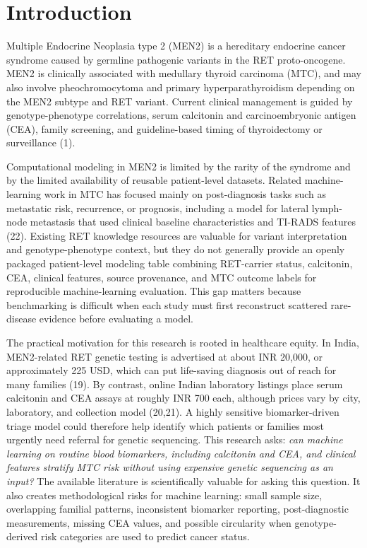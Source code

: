 \documentclass[12pt]{article}
\begin{document}
\section{Introduction}
Multiple Endocrine Neoplasia type 2 (MEN2) is a hereditary endocrine cancer syndrome caused by germline pathogenic variants in the RET proto-oncogene. MEN2 is clinically associated with medullary thyroid carcinoma (MTC), and may also involve pheochromocytoma and primary hyperparathyroidism depending on the MEN2 subtype and RET variant. Current clinical management is guided by genotype-phenotype correlations, serum calcitonin and carcinoembryonic antigen (CEA), family screening, and guideline-based timing of thyroidectomy or surveillance (1).

Computational modeling in MEN2 is limited by the rarity of the syndrome and by the limited availability of reusable patient-level datasets. Related machine-learning work in MTC has focused mainly on post-diagnosis tasks such as metastatic risk, recurrence, or prognosis, including a model for lateral lymph-node metastasis that used clinical baseline characteristics and TI-RADS features (22). Existing RET knowledge resources are valuable for variant interpretation and genotype-phenotype context, but they do not generally provide an openly packaged patient-level modeling table combining RET-carrier status, calcitonin, CEA, clinical features, source provenance, and MTC outcome labels for reproducible machine-learning evaluation. This gap matters because benchmarking is difficult when each study must first reconstruct scattered rare-disease evidence before evaluating a model.

The practical motivation for this research is rooted in healthcare equity. In India, MEN2-related RET genetic testing is advertised at about INR 20,000, or approximately 225 USD, which can put life-saving diagnosis out of reach for many families (19). By contrast, online Indian laboratory listings place serum calcitonin and CEA assays at roughly INR 700 each, although prices vary by city, laboratory, and collection model (20,21). A highly sensitive biomarker-driven triage model could therefore help identify which patients or families most urgently need referral for genetic sequencing. This research asks: \emph{can machine learning on routine blood biomarkers, including calcitonin and CEA, and clinical features stratify MTC risk without using expensive genetic sequencing as an input?} The available literature is scientifically valuable for asking this question. It also creates methodological risks for machine learning: small sample size, overlapping familial patterns, inconsistent biomarker reporting, post-diagnostic measurements, missing CEA values, and possible circularity when genotype-derived risk categories are used to predict cancer status.
\end{document}

